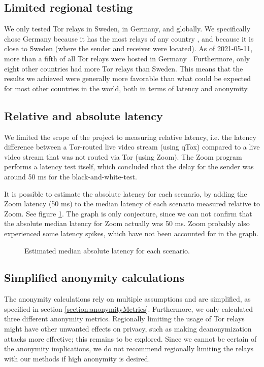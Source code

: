 \documentclass{kththesis}
\begin{document}
\subsection{Limited regional testing}
We only tested Tor relays in Sweden, in Germany, and globally. We specifically chose Germany because it has the most relays of any country \parencite{TorRelaysByCountry}, and because it is close to Sweden (where the sender and receiver were located). As of 2021-05-11, more than a fifth of all Tor relays were hosted in Germany \parencite{TotalAmountTorRelays}. Furthermore, only eight other countries had more Tor relays than Sweden. This means that the results we achieved were generally more favorable than what could be expected for most other countries in the world, both in terms of latency and anonymity.

\subsection{Relative and absolute latency}
We limited the scope of the project to measuring relative latency, i.e. the latency difference between a Tor-routed live video stream (using qTox) compared to a live video stream that was not routed via Tor (using Zoom). The Zoom program performs a latency test itself, which concluded that the delay for the sender was around 50 ms for the black-and-white-test.

It is possible to estimate the absolute latency for each scenario, by adding the Zoom latency (50 ms) to the median latency of each scenario measured relative to Zoom. See figure \ref{fig:absoluteLatency}. The graph is only conjecture, since we can not confirm that the absolute median latency for Zoom actually was 50 ms. Zoom probably also experienced some latency spikes, which have not been accounted for in the graph.

\begin{figure}[!htb]
    \centering
    
    \caption{Estimated median absolute latency for each scenario.}
    \label{fig:absoluteLatency}
\end{figure}

\subsection{Simplified anonymity calculations}
The anonymity calculations rely on multiple assumptions and are simplified, as specified in section \ref{section:anonymityMetrics}. Furthermore, we only calculated three different anonymity metrics. Regionally limiting the usage of Tor relays might have other unwanted effects on privacy, such as making deanonymization attacks more effective; this remains to be explored. Since we cannot be certain of the anonymity implications, we do not recommend regionally limiting the relays with our methods if high anonymity is desired.
\end{document}
